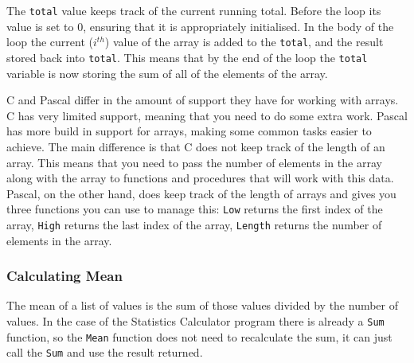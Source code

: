 The \texttt{total} value keeps track of the current running total. Before the loop its value is set to 0, ensuring that it is appropriately initialised. In the body of the loop the current ($i^{th}$) value of the array is added to the \texttt{total}, and the result stored back into \texttt{total}. This means that by the end of the loop the \texttt{total} variable is now storing the sum of all of the elements of the array.

C and Pascal differ in the amount of support they have for working with arrays. C has very limited support, meaning that you need to do some extra work. Pascal has more build in support for arrays, making some common tasks easier to achieve. The main difference is that C does not keep track of the length of an array. This means that you need to pass the number of elements in the array along with the array to functions and procedures that will work with this data. Pascal, on the other hand, does keep track of the length of arrays and gives you three functions you can use to manage this: \texttt{Low} returns the first index of the array, \texttt{High} returns the last index of the array, \texttt{Length} returns the number of elements in the array.




\clearpage
\subsubsection{Calculating Mean} %
\label{ssub:calculating_mean}

The mean of a list of values is the sum of those values divided by the number of values. In the case of the Statistics Calculator program there is already a \texttt{Sum} function, so the \texttt{Mean} function does not need to recalculate the sum, it can just call the \texttt{Sum} and use the result returned.

